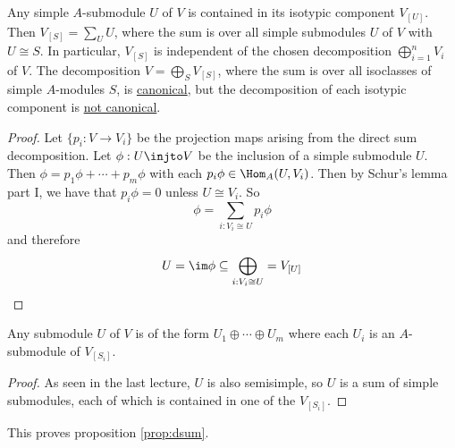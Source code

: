 \begin{thm}
	Any simple $A$-submodule $U$ of $V$ is contained in its isotypic component $V_{[U]}$.
	Then $V_{[S]} = \sum_U U$, where the sum is over all simple submodules $U$ of $V$ with $U \cong S$.
	In particular, $V_{[S]}$ is independent of the chosen decomposition $\bigoplus_{i=1}^n V_i$ of $V$.
	The decomposition $V = \bigoplus_S V_{[S]}$, where the sum is over all isoclasses of simple $A$-modules $S$, is \underline{canonical}, but the decomposition of each isotypic component is \underline{not canonical}.
\end{thm}

\begin{proof}
	Let $\{p_i: V \to V_i\}$ be the projection maps arising from the direct sum decomposition.
	Let $\phi: U \injto V$ be the inclusion of a simple submodule $U$.
	Then $\phi = p_1\phi + \cdots + p_m\phi$ with each $p_i\phi \in \Hom_A(U,V_i)$.
	Then by Schur's lemma part I, we have that $p_i\phi=0$ unless $U \cong V_i$.
	So
	\[\phi = \sum_{i: V_i \cong U} p_i\phi\]
	and therefore
	\[U = \im\phi \subseteq \bigoplus_{i: V_i \cong U} = V_{[U]} \qedhere\]
\end{proof}

\begin{cor}
	Any submodule $U$ of $V$ is of the form $U_1 \oplus \cdots \oplus U_m$ where each $U_i$ is an $A$-submodule of $V_{[S_i]}$.
\end{cor}

\begin{proof}
	As seen in the last lecture, $U$ is also semisimple, so $U$ is a sum of simple submodules, each of which is contained in one of the $V_{[S_i]}$.
\end{proof}

\begin{rmk}
	This proves proposition \ref{prop:dsum}.
\end{rmk}